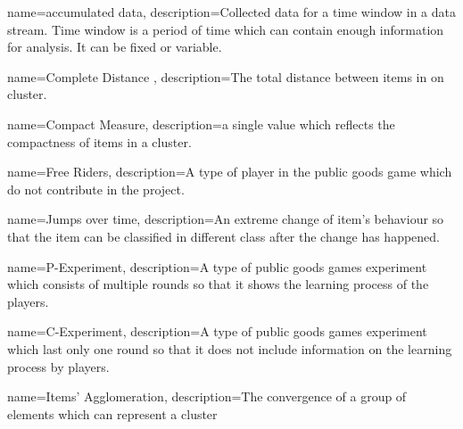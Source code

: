 {
  name=accumulated data,
  description={Collected data for a time window in a data stream. Time window is a period of time which can contain enough information for analysis. It can be fixed or variable.}
}

{
	name=Complete Distance ,
	description={The total distance between items in on cluster.}
}

{
	name=Compact Measure,
	description={a single value which reflects the compactness of items in a cluster.}
}

{
	name=Free Riders,
	description={A type of player in the public goods game which do not contribute in the project.}
}

{
	name=Jumps over time,
	description={An extreme change of item's behaviour so that the item can be classified in different class after the change has happened.}
}

{
	name=P-Experiment,
	description={A type of public goods games experiment which consists of multiple rounds so that it shows the learning process of the  players.}
}

{
	name=C-Experiment,
	description={A type of public goods games experiment which last only one round so that it does not include  information on the learning process by players.}
}

{
	name=Items' Agglomeration,
	description={The convergence of a group of elements which can represent a cluster}
}